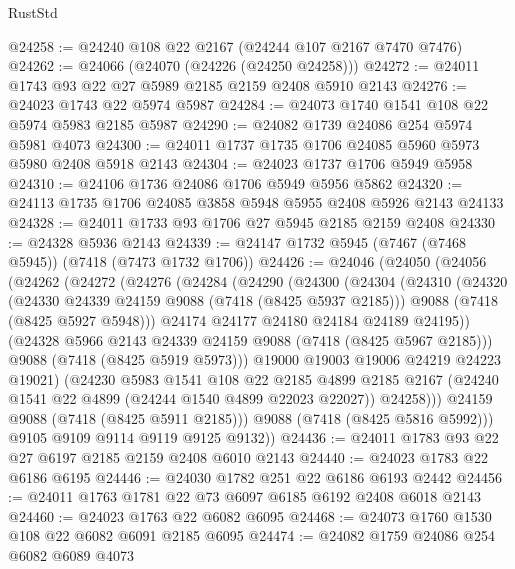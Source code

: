 \begin{lexlean}{RustStd}
\begin{coremodule}
@24258 := @24240 @108 @22 @2167 (@24244 @107 @2167 @7470 @7476)
@24262 := @24066 (@24070 (@24226 (@24250 @24258)))
@24272 := @24011 @1743 @93 @22 @27 @5989 @2185 @2159 @2408 @5910 @2143
@24276 := @24023 @1743 @22 @5974 @5987
@24284 := @24073 @1740 @1541 @108 @22 @5974 @5983 @2185 @5987
@24290 := @24082 @1739 @24086 @254 @5974 @5981 @4073
@24300 := @24011 @1737 @1735 @1706 @24085 @5960 @5973 @5980 @2408 @5918 @2143
@24304 := @24023 @1737 @1706 @5949 @5958
@24310 := @24106 @1736 @24086 @1706 @5949 @5956 @5862
@24320 := @24113 @1735 @1706 @24085 @3858 @5948 @5955 @2408 @5926 @2143 @24133
@24328 := @24011 @1733 @93 @1706 @27 @5945 @2185 @2159 @2408
@24330 := @24328 @5936 @2143
@24339 := @24147 @1732 @5945 (@7467 (@7468 @5945)) (@7418 (@7473 @1732 @1706))
@24426 := @24046
    (@24050
      (@24056
        (@24262
          (@24272
            (@24276
              (@24284
                (@24290
                  (@24300
                    (@24304
                      (@24310
                        (@24320
                          (@24330 @24339 @24159 @9088 (@7418 (@8425 @5937 @2185)))
                          @9088
                          (@7418 (@8425 @5927 @5948)))
                        @24174
                        @24177
                        @24180
                        @24184
                        @24189
                        @24195))
                    (@24328 @5966 @2143 @24339 @24159 @9088 (@7418 (@8425 @5967 @2185)))
                    @9088
                    (@7418 (@8425 @5919 @5973)))
                  @19000
                  @19003
                  @19006
                  @24219
                  @24223
                  @19021)
                (@24230
                  @5983
                  @1541
                  @108
                  @22
                  @2185
                  @4899
                  @2185
                  @2167
                  (@24240 @1541 @22 @4899 (@24244 @1540 @4899 @22023 @22027))
                  @24258)))
            @24159
            @9088
            (@7418 (@8425 @5911 @2185)))
          @9088
          (@7418 (@8425 @5816 @5992)))
        @9105
        @9109
        @9114
        @9119
        @9125
        @9132))
@24436 := @24011 @1783 @93 @22 @27 @6197 @2185 @2159 @2408 @6010 @2143
@24440 := @24023 @1783 @22 @6186 @6195
@24446 := @24030 @1782 @251 @22 @6186 @6193 @2442
@24456 := @24011 @1763 @1781 @22 @73 @6097 @6185 @6192 @2408 @6018 @2143
@24460 := @24023 @1763 @22 @6082 @6095
@24468 := @24073 @1760 @1530 @108 @22 @6082 @6091 @2185 @6095
@24474 := @24082 @1759 @24086 @254 @6082 @6089 @4073

\end{coremodule}
\end{lexlean}
